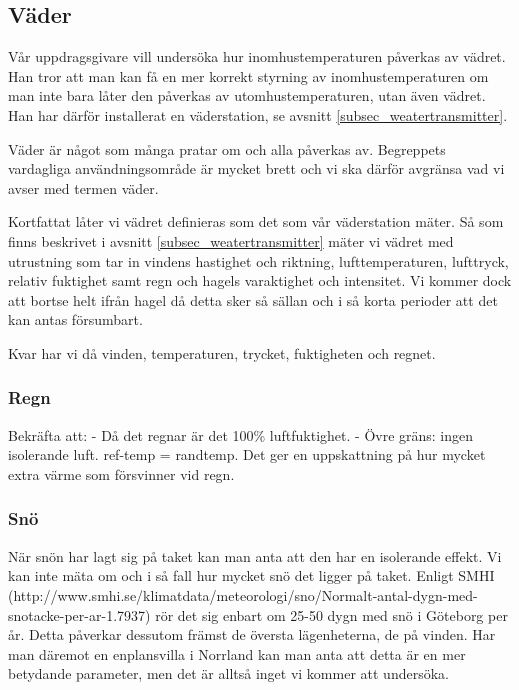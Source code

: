 \subsection{Väder}

Vår uppdragsgivare vill undersöka hur inomhustemperaturen påverkas av vädret. Han tror att man kan få en mer korrekt styrning av inomhustemperaturen om man inte bara låter den påverkas av utomhustemperaturen, utan även vädret. Han har därför installerat en väderstation, se avsnitt \ref{subsec_weatertransmitter}.

Väder är något som många pratar om och alla påverkas av. Begreppets vardagliga användningsområde är mycket brett och vi ska därför avgränsa vad vi avser med termen väder. 

Kortfattat låter vi vädret definieras som det som vår väderstation mäter. Så som finns beskrivet i avsnitt \ref{subsec_weatertransmitter} mäter vi vädret med utrustning som tar in vindens hastighet och riktning, lufttemperaturen, lufttryck, relativ fuktighet samt regn och hagels varaktighet och intensitet. Vi kommer dock att bortse helt ifrån hagel då detta sker så sällan och i så korta perioder att det kan antas försumbart. %

Kvar har vi då vinden, temperaturen, trycket, fuktigheten och regnet.

\subsubsection{Regn}
Bekräfta att:
- Då det regnar är det 100\% luftfuktighet. %
- Övre gräns: ingen isolerande luft. ref-temp = randtemp.
Det ger en uppskattning på hur mycket extra värme som försvinner vid regn. 



\subsubsection{Snö}
När snön har lagt sig på taket kan man anta att den har en isolerande effekt. Vi kan inte mäta om och i så fall hur mycket snö det ligger på taket. Enligt SMHI (http://www.smhi.se/klimatdata/meteorologi/sno/Normalt-antal-dygn-med-snotacke-per-ar-1.7937) rör det sig enbart om 25-50 dygn med snö i Göteborg per år. Detta påverkar dessutom främst de översta lägenheterna, de på vinden. Har man däremot en enplansvilla i Norrland kan man anta att detta är en mer betydande parameter, men det är alltså inget vi kommer att undersöka.